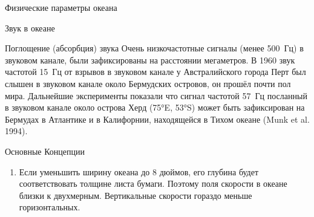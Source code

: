 \begin{chapter}{Физические параметры океана}
\begin{section}{Звук в океане}
\begin{paragraph}{Поглощение (абсорбция) звука}
Очень низкочастотные сигналы (менее 500~Гц) в звуковом канале, были
зафиксированы на расстоянии мегаметров. В 1960 звук частотой 15~Гц от
взрывов в звуковом канале у Австралийского города Перт был слышен в
звуковом канале около Бермудских островов, он прошёл почти пол
мира. Дальнейшие эксперименты показали что сигнал частотой 57~Гц
посланный в звуковом канале около острова Херд (75°E, 53°S) может быть
зафиксирован на Бермудах в Атлантике и в Калифорнии, находящейся в
Тихом океане (Munk et al. 1994).
%
\end{paragraph}


\end{section}

\begin{section}{Основные Концепции}
\begin{enumerate}
\item
Если уменьшить ширину океана до 8 дюймов, его глубина будет
соответствовать толщине листа бумаги. Поэтому поля скорости в океане
близки к двухмерным. Вертикальные скорости гораздо меньше
горизонтальных.
%



\end{enumerate}
\end{section}
\end{chapter}
